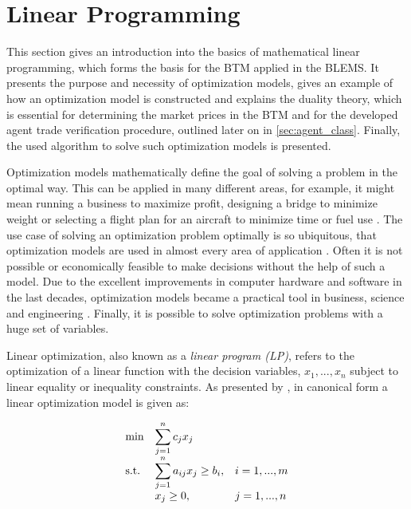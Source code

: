 \section{Linear Programming}
\label{sec:linear_progamming}
This section gives an introduction into the basics of mathematical linear programming, 
which forms the basis for the BTM applied in the BLEMS.
It presents the purpose and necessity of optimization models, gives
an example of how an optimization model is constructed and explains the duality theory,
which is essential for determining the market prices in the BTM and for the developed 
agent trade verification procedure, outlined later on in \ref{sec:agent_class}. Finally,
the used algorithm to solve such optimization models is presented.

Optimization models mathematically define the goal of solving a problem in the optimal way.
This can be applied in many different areas, for example, it might mean running a business to 
maximize profit, designing a bridge to minimize weight or selecting a flight plan for an aircraft
to minimize time or fuel use . 
The use case of solving an optimization problem optimally is so ubiquitous, 
that optimization models are used in almost every area of application .
Often it is not possible or economically feasible to make decisions without the help
of such a model. Due to the excellent improvements in computer hardware and software
in the last decades, optimization models became a practical tool 
in business, science and engineering . 
Finally, it is possible to solve optimization problems with a huge set of variables. 

Linear optimization, also known as a \textit{linear program (LP)}, refers to the optimization
of a linear function with the decision variables, $x_{1}, ..., x_{n}$ subject to 
linear equality or inequality constraints. 
As presented by , in canonical form 
a linear optimization model is given as:

\begin{equation*}
    \begin{array}{ll@{}ll}
        \text{min}  & \displaystyle\sum\limits_{j=1}^{n} c_{j}x_{j} &\\
        \text{s.t.}& \displaystyle\sum\limits_{j=1}^{n} a_{ij}x_{j} \geq b_{i},  &&i=1 ,..., m\\
                    &                        x_{j} \geq 0, &&j=1 ,..., n
    \end{array}
\end{equation*}

